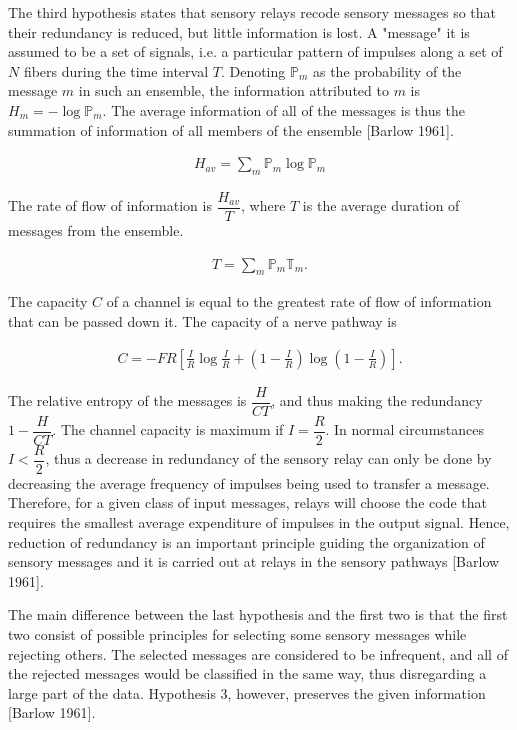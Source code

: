 \documentclass[twoside]{article}
\begin{document}
\begin{multicols}{2}
The third hypothesis states that sensory relays recode sensory messages so that their redundancy is reduced, but little information is lost. A "message" it is assumed to be a set of signals, i.e. a particular pattern of impulses along a set of $N$ fibers during the time interval $T$. Denoting $\mathbb{P}_m$ as the probability of the message $m$ in such an ensemble, the information attributed to $m$ is $H_{m}=-\log \mathbb{P}_m$. The average information of all of the messages is thus the summation of information of all members of the ensemble [Barlow 1961].

\begin{align} \label{eq:1}
	H_{av}= \sum_m \mathbb{P}_m \log \mathbb{P}_m
\end{align}

The rate of flow of information is $\dfrac{H_{av}}{T}$, where $T$ is the average duration of messages from the ensemble.

\begin{align} \label{eq:2}
	T = \sum_m \mathbb{P}_m \mathbb{T}_m.
\end{align}

The capacity $C$ of a channel is equal to the greatest rate of flow of information that can be passed down it. The capacity of a nerve pathway is

\begin{align} \label{eq:3}
	C = - FR \left[\frac{I}{R} \log \frac{I}{R} +\left(1-\frac{I}{R} \right) \log  \left(1-\frac{I}{R} \right) \right].
\end{align}

The relative entropy of the messages is $\dfrac{H}{CT}$, and thus making the redundancy $1-\dfrac{H}{CT}$. The channel capacity is maximum if $I = \dfrac{R}2$. In normal circumstances $I < \dfrac{R}{2}$, thus a decrease in redundancy of the sensory relay can only be done by decreasing the average frequency of impulses being used to transfer a message. Therefore, for a given class of input messages, relays will choose the code that requires the smallest average expenditure of impulses in the output signal. Hence, reduction of redundancy is an important principle guiding the organization of sensory messages and it is carried out at relays in the sensory pathways [Barlow 1961].

The main difference between the last hypothesis and the first two is that the first two consist of possible principles for selecting some sensory messages while rejecting others. The selected messages are considered to be infrequent, and all of the rejected messages would be classified in the same way, thus disregarding a large part of the data. Hypothesis 3, however, preserves the given information [Barlow 1961].


\end{multicols}
\end{document}
